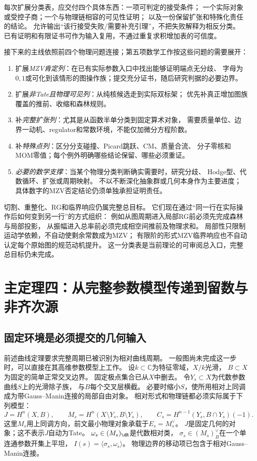 \documentclass[11pt,a4paper]{ctexart}
\theoremstyle{cnplain}\newtheorem{theorem}{定理}[section]
\theoremstyle{definition}\newtheorem{definition}[theorem]{定义}
\theoremstyle{remark}\newtheorem{remark}[theorem]{注}
\begin{document}
每次扩展分类表，应交付四个具体东西：一项可判定的接受条件；
一个实际对象或受控子商；一个与物理链相容的可见性证明；
以及一份保留扩张和特殊化责任的结论。
允许输出“该行接受失败/需要补充引理”，不把失败解释为相反分类。
已有证明和有限证书可作为输入复用，不通过重复求积增加表的可信度。

接下来的主线依照前四个物理问题连接；第五项数学工作按这些问题的需要展开：
\begin{enumerate}
 \item 扩展\emph{MZV肯定列}：在已有实际参数入口中找出能够证明端点无分歧、
 字母为$0,1$或可化到该情形的图操作族；提交充分证书，随后研究判据的必要边界。
 \item 扩展\emph{非Tate且物理可见列}：从纯核候选走到实际双标架；
 优先补真正增加图族覆盖的推前、收缩和森林规则。
 \item 补\emph{完整扩张列}：尤其是从函数半单分类到固定算术对象，
 需要质量单位、边界一动机、regulator和常数环境，不能仅加微分方程阶数。
 \item 补\emph{特殊点列}：区分分支碰撞、Picard跳跃、CM、质量合流、
 分子零核和MOM零值；每个例外明确哪些结论保留、哪些必须重证。
 \item \emph{必要的数学支撑}：当某个物理分类判断确实需要时，研究分歧、
 Hodge型、代数循环、扩张或周期映射。
 不以不断深化抽象群或几何本身作为主要进度；
 具体数字的MZV否定结论仍须单独承担证明责任。
\end{enumerate}
切割、重整化、RG和临界响应仍属完整总目标。
它们现在通过“同一行在实际操作后如何变到另一行”的方式组织：
例如从图周期进入局部RG前必须先完成森林与局部投影，
从振幅进入总率前必须完成相空间推前及物理求和。
局部性只限制运动学依赖，不自动使剩余常数成为MZV；
有限阶的形式MZV临界响应也不自动认定每个原始图的规范动机提升。
这一分类表是当前理论的可审阅总入口，完整总目标仍未完成。


\section{主定理四：从完整参数模型传递到留数与非齐次源}
\label{sec:pencil}
\subsection{固定环境是必须提交的几何输入}
前述曲线定理要求完整周期已被识别为相对曲线周期。
一般图尚未完成这一步时，可以直接在其高维参数模型上工作。
设$k\subset\mathbb C$为特征零域，$X/k$光滑，
$B\subset X$为固定的简单正常交叉边界。
固定极点集合已从$X$中删去。
令$Y_s\subset X$为代数参数曲线$S$上的光滑除子族，
与$B$每个交叉层横截。
必要时缩小$S$，使所用相对上同调成为带Gauss--Manin连接的局部自由对象。
相对形式和物理链都必须实际属于下列模型：
\[
 J=H^n(X,B),\qquad
 M_s=H^n(X\setminus Y_s,B\setminus Y_s),\qquad
 C_s=H^{n-1}(Y_s,B\cap Y_s)(-1).
\]
这里$M_s$用上同调方向，前文最小物理对象承载于$E_s=M_s^\vee$。
$J$是固定几何的对象；这不表示$J$自动为Tate。
$\omega_s\in(M_s)_{\dR}$是代数相对类，
$\sigma_s\in(M_s)_B^\vee$在一个单连通参数开集上平坦，
$I(s)=\langle\sigma_s,\omega_s\rangle$。
物理边界的移动项已包含于相对Gauss--Manin连接。
\end{document}

